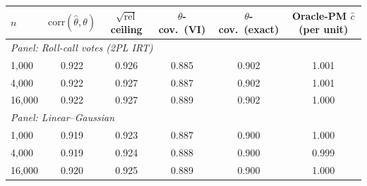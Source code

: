 \begin{tabular}{lccccc}
\toprule
$n$ & $\mathrm{corr}(\hat\theta,\theta)$ & $\sqrt{\mathrm{rel}}$ ceiling & $\theta$-cov.\ (VI) & $\theta$-cov.\ (exact) & Oracle-PM $\hat c$ (per unit) \\
\midrule
\multicolumn{6}{l}{\emph{Panel: Roll-call votes (2PL IRT)}} \\
1,000 & 0.922 & 0.926 & 0.885 & 0.902 & 1.001 \\
4,000 & 0.922 & 0.927 & 0.887 & 0.902 & 1.001 \\
16,000 & 0.922 & 0.927 & 0.889 & 0.902 & 1.000 \\
\midrule
\multicolumn{6}{l}{\emph{Panel: Linear--Gaussian}} \\
1,000 & 0.919 & 0.923 & 0.887 & 0.900 & 1.000 \\
4,000 & 0.919 & 0.924 & 0.888 & 0.900 & 0.999 \\
16,000 & 0.920 & 0.925 & 0.889 & 0.900 & 1.000 \\
\bottomrule
\end{tabular}
